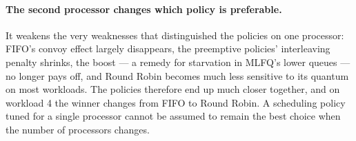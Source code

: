 \documentclass[11pt,a4paper]{article}
\begin{document}
\paragraph{The second processor changes which policy is preferable.} It weakens the very
weaknesses that distinguished the policies on one processor: FIFO's convoy effect largely
disappears, the preemptive policies' interleaving penalty shrinks, the boost --- a remedy for
starvation in MLFQ's lower queues --- no longer pays off, and Round Robin becomes much less
sensitive to its quantum on most workloads. The policies therefore end up much closer together, and on workload 4
the winner changes from FIFO to Round Robin. A scheduling policy tuned for a single processor
cannot be assumed to remain the best choice when the number of processors changes.
\end{document}
